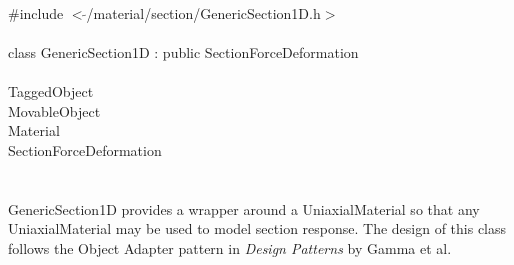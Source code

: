 
   \\
\indent \#include $<\tilde{ }$/material/section/GenericSection1D.h$>$  \\

  \\
\indent class GenericSection1D : public SectionForceDeformation \\

 \\
\indent TaggedObject \\
\indent MovableObject \\
\indent\indent Material \\
\indent\indent\indent SectionForceDeformation \\
\indent\indent\indent{} \\

  \\
\indent GenericSection1D provides a wrapper around a UniaxialMaterial
so that any UniaxialMaterial may be used to model section response. 
The design of this class follows the Object Adapter pattern in 
{\em Design Patterns} by Gamma et al.\\

